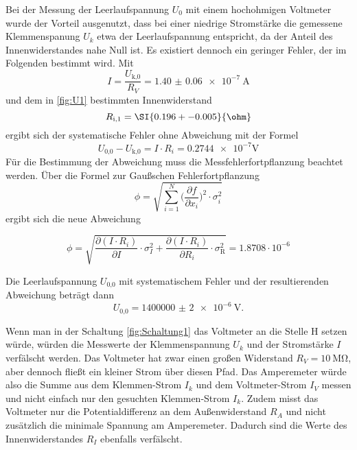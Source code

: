   Bei der Messung der Leerlaufspannung $U_0$ mit einem hochohmigen Voltmeter
  wurde der Vorteil ausgenutzt, dass bei einer niedrige Stromstärke die
  gemessene Klemmenspanung $U_k$ etwa der Leerlaufspannung entspricht, da
  der Anteil des Innenwiderstandes nahe Null ist.
  Es existiert dennoch ein geringer Fehler, der im Folgenden bestimmt wird.
  Mit
  \begin{equation}
    I = \frac{U_\text{k,0}}{R_V} = \SI{1.40(6)e-7}{\A}
  \end{equation}
  und dem in \ref{fig:U1} bestimmten Innenwiderstand
  \begin{equation}
    R_\text{i,1} = \SI{0.196 +- 0.005}{\ohm}
  \end{equation}
  ergibt sich der systematische Fehler ohne Abweichung mit der Formel
  \begin{equation}
    U_\text{0,0} - U_\text{k,0} = I \cdot R_i = \num{0.2744e-7} \si{\V}
  \end{equation}
  Für die Bestimmung der Abweichung muss die Messfehlerfortpflanzung
  beachtet werden. Über die Formel zur Gaußschen Fehlerfortpflanzung
  \begin{equation}
    \phi = \sqrt{\sum_{i=1}^{N} \biggl(\frac{\partial f}{\partial x_i}\biggr)^2
    \cdot \sigma_i^2}
  \end{equation}
  ergibt sich die neue Abweichung

  \begin{equation}
    \phi = \sqrt{\frac{\partial(I \cdot R_i)}{\partial I} \cdot \sigma_I^2
    + \frac{\partial(I \cdot R_i)}{\partial R_i} \cdot \sigma_\text{R}^2}
    = 1.8708 \cdot 10^{-6}
  \end{equation}

  Die Leerlaufspannung $U_\text{0,0}$ mit systematischem Fehler und der
  resultierenden Abweichung beträgt dann
  \begin{equation}
    U_\text{0,0} = \SI{1400000(2)e-6}{\V}.
  \end{equation}

  Wenn man in der Schaltung \ref{fig:Schaltung1} das Voltmeter an die Stelle H
  setzen würde, würden die Messwerte der Klemmenspannung $U_k$ und der
  Stromstärke $I$ verfälscht werden. Das Voltmeter hat zwar einen großen
  Widerstand $R_V = \SI{10}{\mega\ohm}$, aber dennoch fließt ein kleiner Strom
  über diesen Pfad. Das Amperemeter würde also die Summe aus dem
  Klemmen-Strom $I_k$ und dem Voltmeter-Strom $I_V$ messen und nicht einfach
  nur den gesuchten Klemmen-Strom $I_k$.
  Zudem misst das Voltmeter nur die Potentialdifferenz an dem Außenwiderstand
  $R_A$ und nicht zusätzlich die minimale Spannung am Amperemeter. Dadurch
  sind die Werte des Innenwiderstandes $R_I$ ebenfalls verfälscht.
